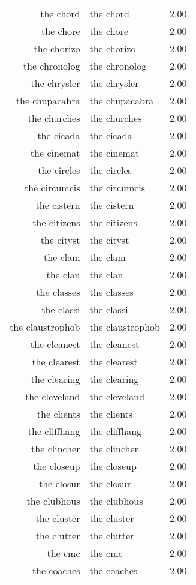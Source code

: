 \begin{table}[ht]
\begin{tabular}{rlr}
  the chord & the chord & 2.00 \\ 
  the chore & the chore & 2.00 \\ 
  the chorizo & the chorizo & 2.00 \\ 
  the chronolog & the chronolog & 2.00 \\ 
  the chrysler & the chrysler & 2.00 \\ 
  the chupacabra & the chupacabra & 2.00 \\ 
  the churches & the churches & 2.00 \\ 
  the cicada & the cicada & 2.00 \\ 
  the cinemat & the cinemat & 2.00 \\ 
  the circles & the circles & 2.00 \\ 
  the circumcis & the circumcis & 2.00 \\ 
  the cistern & the cistern & 2.00 \\ 
  the citizens & the citizens & 2.00 \\ 
  the cityst & the cityst & 2.00 \\ 
  the clam & the clam & 2.00 \\ 
  the clan & the clan & 2.00 \\ 
  the classes & the classes & 2.00 \\ 
  the classi & the classi & 2.00 \\ 
  the claustrophob & the claustrophob & 2.00 \\ 
  the cleanest & the cleanest & 2.00 \\ 
  the clearest & the clearest & 2.00 \\ 
  the clearing & the clearing & 2.00 \\ 
  the cleveland & the cleveland & 2.00 \\ 
  the clients & the clients & 2.00 \\ 
  the cliffhang & the cliffhang & 2.00 \\ 
  the clincher & the clincher & 2.00 \\ 
  the closeup & the closeup & 2.00 \\ 
  the closur & the closur & 2.00 \\ 
  the clubhous & the clubhous & 2.00 \\ 
  the cluster & the cluster & 2.00 \\ 
  the clutter & the clutter & 2.00 \\ 
  the cmc & the cmc & 2.00 \\ 
  the coaches & the coaches & 2.00 \\ 

\end{tabular}
\end{table}
